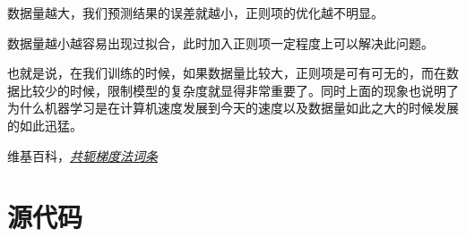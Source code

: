 \documentclass{ML}
\begin{document}
数据量越大，我们预测结果的误差就越小，正则项的优化越不明显。

数据量越小越容易出现过拟合，此时加入正则项一定程度上可以解决此问题。

也就是说，在我们训练的时候，如果数据量比较大，正则项是可有可无的，而在数据比较少的时候，限制模型的复杂度就显得非常重要了。同时上面的现象也说明了为什么机器学习是在计算机速度发展到今天的速度以及数据量如此之大的时候发展的如此迅猛。

\begin{thebibliography}{0}
     维基百科，{\it \href{https://zh.wikipedia.org/wiki/共轭梯度法}{共轭梯度法词条}}
\end{thebibliography}

\appendix

\section{源代码}

\inputminted[breaklines=true,frame=lines,mathescape=true]{julia}{../LinnerModel.jl}
\end{document}

